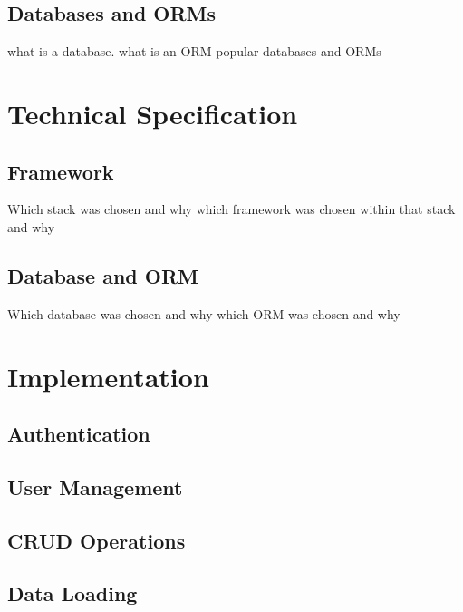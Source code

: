 \documentclass[12pt, a4paper,twoside]{report}
\theoremstyle{plain} %
\theoremstyle{definition} %
\numberwithin{equation}{chapter}
\begin{document}
\section{Databases and ORMs}\label{sec:databasesorms}

what is a database.
what is an ORM
popular databases and ORMs


\chapter{Technical Specification}\label{ch:techspec}

\section{Framework}\label{sec:framework}

Which stack was chosen and why
which framework was chosen within that stack and why

\section{Database and ORM}\label{sec:databaseorm}

Which database was chosen and why
which ORM was chosen and why


\chapter{Implementation}\label{ch:implementation}

\section{Authentication}\label{sec:authentication}

\section{User Management}\label{sec:usermanagement}

\section{CRUD Operations}\label{sec:crudoperations}

\section{Data Loading}\label{sec:dataloading}
\end{document}
